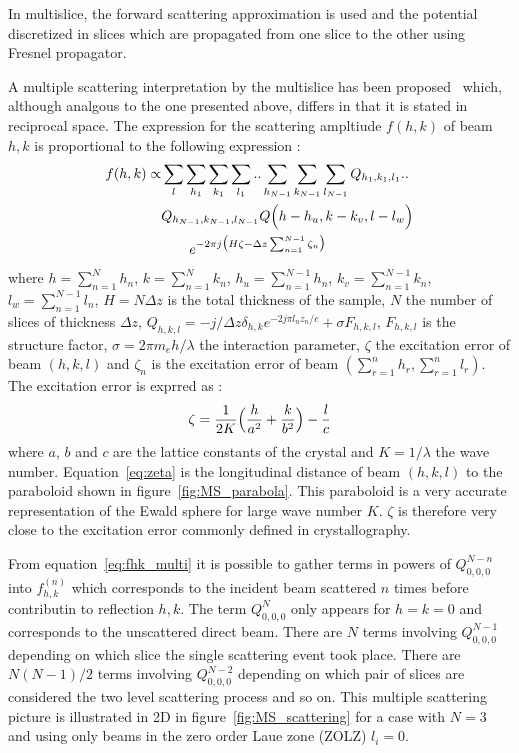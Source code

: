 In multislice, the forward scattering approximation is used and the
potential discretized in slices which are propagated from one slice to
the other using Fresnel propagator.

A multiple scattering interpretation by the multislice has been
proposed~\cite{CowleyMoodie1957} which, although analgous to the
one presented above, differs in that it is stated in reciprocal space.
The expression for the scattering ampltiude $f(h,k)$ of beam $h,k$ is
proportional to the following expression :
%
\begin{align}
  f(h,k) \propto
    &\sum_{l}\sum_{h_1}\sum_{k_1}\sum_{l_1}..
      \sum_{h_{N-1}}\sum_{k_{N-1}}\sum_{l_{N-1}}Q_{h_1,k_1,l_1}..\nonumber\\
    &Q_{h_{N-1},k_{N-1},l_{N-1}}Q\Bigl(h-h_u,k-k_v,l-l_w\Bigr)   \nonumber\\
    &~~~~~~e^{-2\pi j\bigl(H\zeta - \Delta z\sum_{n=1}^{N-1}\zeta_n\bigr)}\label{eq:fhk_multi}
\end{align}
%
where $h=\sum_{n=1}^N h_n$, $k=\sum_{n=1}^N k_n$,
$h_u=\sum_{n=1}^{N-1} h_n$, $k_v=\sum_{n=1}^{N-1} k_n$, $l_w=\sum_{n=1}^{N-1} l_n$,
$H=N\Delta z$ is the total thickness of the sample,
$N$ the number of slices of thickness $\Delta z$,
$Q_{h,k,l}=-j/\Delta z\delta_{h,k}e^{-2j\pi l_n z_n/c} + \sigma F_{h,k,l}$,
$F_{h,k,l}$ is the structure factor,
$\sigma=2\pi m_eh/\lambda$ the interaction parameter,
$\zeta$ the excitation error of beam $(h,k,l)$ and
$\zeta_n$ is the excitation error of beam
$\left(\sum_{r=1}^{n} h_r,\sum_{r=1}^n l_r\right)$.
The excitation error is exprred as :
%
\begin{equation}\label{eq:zeta}
  \zeta = \frac{1}{2K}\Bigl(\frac{h}{a^2} + \frac{k}{b^2}\Bigr) - \frac{l}{c}
\end{equation}
%
where $a$, $b$ and $c$ are the lattice constants of the crystal and
$K=1/\lambda$ the wave number.
Equation~\eqref{eq:zeta} is the longitudinal distance of beam $(h,k,l)$ to
the paraboloid shown in figure~\ref{fig:MS_parabola}.
This paraboloid is a very accurate representation of the Ewald sphere for
large wave number $K$. $\zeta$ is therefore very close to the excitation
error commonly defined in crystallography.

From equation~\eqref{eq:fhk_multi} it is possible to gather terms in
powers of $Q_{0,0,0}^{N-n}$ into $f_{h,k}^{(n)}$ which corresponds to the
incident beam scattered $n$ times before contributin to reflection $h,k$.
The term $Q_{0,0,0}^N$ only appears for $h=k=0$ and corresponds to the
unscattered direct beam.
There are $N$ terms involving $Q_{0,0,0}^{N-1}$ depending on which slice
the single scattering event took place.
There are $N(N-1)/2$ terms involving $Q_{0,0,0}^{N-2}$ depending on which
pair of slices are considered the two level scattering process and so on.
This multiple scattering picture is illustrated in 2D in figure~\ref{fig:MS_scattering}
for a case with $N=3$ and using only beams in the zero order Laue zone (ZOLZ)
$l_i=0$.

